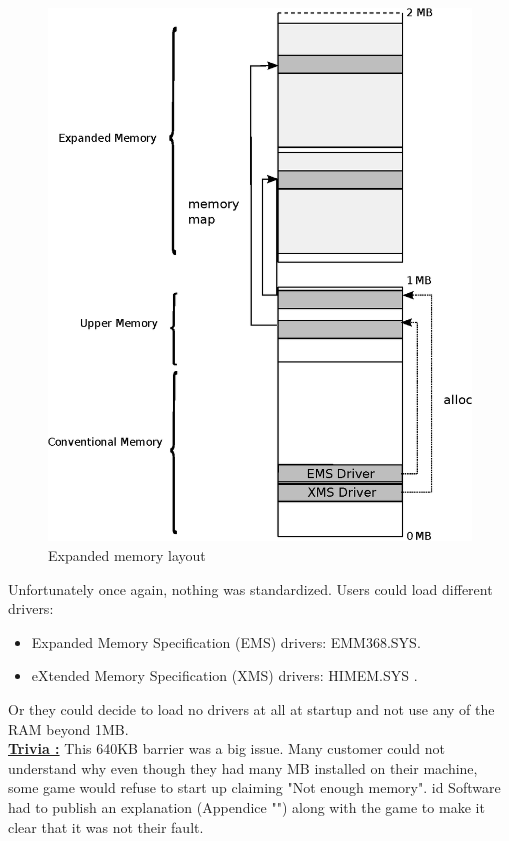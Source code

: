 \documentclass[book.tex]{subfiles}
\begin{document}
\begin{figure}[H]
\centering
\includegraphics[scale=1]{imgs/expanded_ram.eps}
\caption{Expanded memory layout}
\label{fig:ems_xms_layout}
\end{figure}

Unfortunately once again, nothing was standardized. Users could load different drivers:
\begin{itemize}
\item Expanded Memory Specification (EMS) drivers: EMM368.SYS.
\item eXtended Memory Specification (XMS) drivers: HIMEM.SYS .
\end{itemize}

Or they could decide to load no drivers at all at startup and not use any of the RAM beyond 1MB.\\
\textbf{\underline{Trivia :}}  This 640KB barrier was a big issue. Many customer could not understand why even though they had many MB installed on their machine, some game would refuse to start up claiming "Not enough memory". id Software had to publish an explanation (Appendice "") along with the game to make it clear that it was not their fault.
\end{document}
